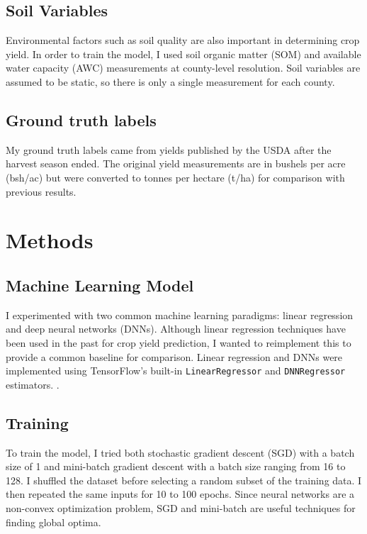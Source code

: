\documentclass[letterpaper]{article}
\begin{document}
\subsection{Soil Variables}

Environmental factors such as soil quality are also important in determining crop yield. In order to train the model, I used soil organic matter (SOM) and available water capacity (AWC) measurements at county-level resolution. Soil variables are assumed to be static, so there is only a single measurement for each county.

\subsection{Ground truth labels}

My ground truth labels came from yields published by the USDA after the harvest season ended. The original yield measurements are in bushels per acre (bsh/ac) but were converted to tonnes per hectare (t/ha) for comparison with previous results.

\section{Methods}

\subsection{Machine Learning Model}

I experimented with two common machine learning paradigms: linear regression and deep neural networks (DNNs). Although linear regression techniques have been used in the past for crop yield prediction, I wanted to reimplement this to provide a common baseline for comparison. Linear regression and DNNs were implemented using TensorFlow's built-in \texttt{LinearRegressor} and \texttt{DNNRegressor} estimators. \cite{tensorflow2015-whitepaper}.

\subsection{Training}

To train the model, I tried both stochastic gradient descent (SGD) with a batch size of 1 and mini-batch gradient descent with a batch size ranging from 16 to 128. I shuffled the dataset before selecting a random subset of the training data. I then repeated the same inputs for 10 to 100 epochs. Since neural networks are a non-convex optimization problem, SGD and mini-batch are useful techniques for finding global optima.
\end{document}
